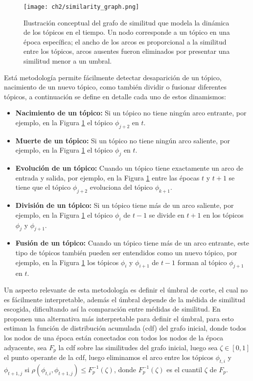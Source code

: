 \documentclass[letterpaper,12pt,oneside]{book} %
\begin{document}
\begin{figure}
    \centering
    \texttt{[image: ch2/similarity\_graph.png]}
    \caption{Ilustración conceptual del grafo de similitud que modela la dinámica de los tópicos en el tiempo. Un nodo corresponde a un tópico en una época específica; el ancho de los arcos es proporcional a la similitud entre los tópicos, arcos ausentes fueron eliminados por presentar una similitud menor a un umbral.}
    \label{img:graph}
\end{figure}

Está metodología permite fácilmente detectar desaparición de un tópico, nacimiento de un nuevo tópico, como también dividir o fusionar diferentes tópicos, a continuación se define en detalle cada uno de estos dinamismos:

\begin{itemize}
    \item \textbf{Nacimiento de un tópico:} Si un tópico no tiene ningún arco entrante, por ejemplo, en la Figura \ref{img:graph} el tópico $\phi_{j+2}$ en $t$.
    \item \textbf{Muerte de un tópico:} Si un tópico no tiene ningún arco saliente, por ejemplo, en la Figura \ref{img:graph} el tópico $\phi_{j}$ en $t$.
    \item \textbf{Evolución de un tópico:} Cuando un tópico tiene exactamente un arco de entrada y salida, por ejemplo, en la Figura \ref{img:graph} entre las épocas $t$ y $t+1$ se tiene que el tópico $\phi_{j+2}$ evoluciona del tópico $\phi_{k+1}$.
    \item \textbf{División de un tópico:} Si un tópico tiene más de un arco saliente, por ejemplo, en la Figura \ref{img:graph} el tópico $\phi_{i}$ de $t-1$ se divide en $t+1$ en los tópicos $\phi_{j}$ y $\phi_{j+1}$.
    \item \textbf{Fusión de un tópico:} Cuando un tópico tiene más de un arco entrante, este tipo de tópicos también pueden ser entendidos como un nuevo tópico, por ejemplo, en la Figura \ref{img:graph} los tópicos $\phi_{i}$ y $\phi_{i+1}$ de $t-1$ forman al tópico $\phi_{j+1}$ en $t$.
\end{itemize}

Un aspecto relevante de esta metodología es definir el úmbral de corte, el cual no es fácilmente interpretable, además el úmbral depende de la médida de similitud escogida, dificultando así la comparación entre médidas de similitud. En \cite{beykikhoshk2018discovering} proponen una alternativa más interpretable para definir el úmbral, para esto estiman la función de distribución acumulada (cdf) del grafo inicial, donde todos los nodos de una época están conectados con todos los nodos de la época adyacente, sea $F_{p}$ la cdf sobre las similitudes del grafo inicial, luego sea $\zeta \in [0,1]$ el punto operante de la cdf, luego eliminamos el arco entre los tópicos $\phi_{t,i}$ y $\phi_{t+1,j}$ si $\rho(\phi_{t,i}, \phi_{t+1,j})\leq F_{p}^{-1}(\zeta)$, donde  $F_{p}^{-1}(\zeta)$ es el cuantil $\zeta$ de $F_{p}$.
\end{document}
